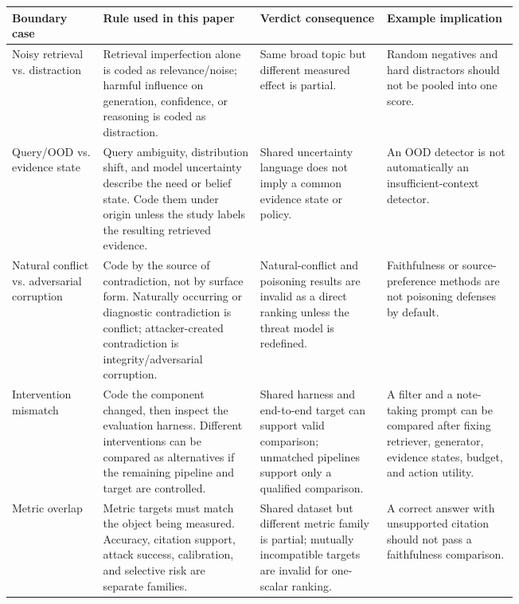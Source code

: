 \begin{table}[t]
\centering
\scriptsize
\renewcommand{\arraystretch}{0.88}
\begin{tabularx}{\linewidth}{>{\raggedright\arraybackslash}p{0.18\linewidth}>{\raggedright\arraybackslash}p{0.31\linewidth}>{\raggedright\arraybackslash}p{0.25\linewidth}X}
\toprule
\textbf{Boundary case} & \textbf{Rule used in this paper} & \textbf{Verdict consequence} & \textbf{Example implication} \\
\midrule
Noisy retrieval vs. distraction & Retrieval imperfection alone is coded as relevance/noise; harmful influence on generation, confidence, or reasoning is coded as distraction. & Same broad topic but different measured effect is partial. & Random negatives and hard distractors should not be pooled into one score. \\
Query/OOD vs. evidence state & Query ambiguity, distribution shift, and model uncertainty describe the need or belief state. Code them under origin unless the study labels the resulting retrieved evidence. & Shared uncertainty language does not imply a common evidence state or policy. & An OOD detector is not automatically an insufficient-context detector. \\
Natural conflict vs. adversarial corruption & Code by the source of contradiction, not by surface form. Naturally occurring or diagnostic contradiction is conflict; attacker-created contradiction is integrity/adversarial corruption. & Natural-conflict and poisoning results are invalid as a direct ranking unless the threat model is redefined. & Faithfulness or source-preference methods are not poisoning defenses by default. \\
Intervention mismatch & Code the component changed, then inspect the evaluation harness. Different interventions can be compared as alternatives if the remaining pipeline and target are controlled. & Shared harness and end-to-end target can support valid comparison; unmatched pipelines support only a qualified comparison. & A filter and a note-taking prompt can be compared after fixing retriever, generator, evidence states, budget, and action utility. \\
Metric overlap & Metric targets must match the object being measured. Accuracy, citation support, attack success, calibration, and selective risk are separate families. & Shared dataset but different metric family is partial; mutually incompatible targets are invalid for one-scalar ranking. & A correct answer with unsupported citation should not pass a faithfulness comparison. \\

\end{tabularx}
\end{table}
